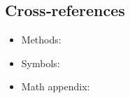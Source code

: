 \documentclass[
  13pt,
  a4paperpaper,
  12pt]{article}
\providecommand{\tightlist}{%
  \setlength{\itemsep}{0pt}\setlength{\parskip}{0pt}}
\begin{document}
\subsection{Cross‑references}\label{crossreferences}

\begin{itemize}
\tightlist
\item
  Methods: 
\item
  Symbols: 
\item
  Math appendix: 
\end{itemize}
\end{document}
